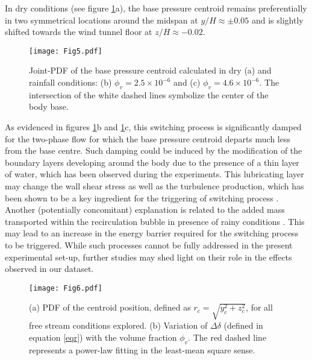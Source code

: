 \documentclass[doublecol]{epl2}
\begin{document}

In dry conditions (see figure \ref{fig5}a), the base pressure centroid remains preferentially in two symmetrical locations around the midspan at $y/H \approx \pm 0.05$ and is slightly shifted towards the wind tunnel floor at $z/H \approx -0.02$.

\begin{figure}
\centering
\texttt{[image: Fig5.pdf]}
\caption{Joint-PDF of the base pressure centroid calculated in dry (a) and rainfall conditions: (b) $\phi_v = 2.5\times10^{-6}$ and (c) $\phi_v = 4.6\times10^{-6}$. The intersection of the white dashed lines symbolize the center of the body base.}
\label{fig5}
\end{figure}


As evidenced in figures \ref{fig5}b and \ref{fig5}c, this switching process is significantly damped for the two-phase flow for which the base pressure centroid departs much less from the base centre. Such damping could be induced by the modification of the boundary layers developing around the body due to the presence of a thin layer of water, which has been observed during the experiments. This lubricating layer may change the wall shear stress as well as the turbulence production, which has been shown to be a key ingredient for the triggering of switching process \cite{hesse2021}. Another (potentially concomitant) explanation is related to the added mass transported within the recirculation bubble in presence of rainy conditions \cite{travis2022,lorite2020}. This may lead to an increase in the energy barrier required for the switching process to be triggered. While such processes cannot be fully addressed in the present experimental set-up, further studies may shed light on their role in the effects observed in our dataset.

\begin{figure}
\centering
\texttt{[image: Fig6.pdf]}
\caption{(a) PDF of the centroid position, defined as $r_c=\sqrt{y_c^2+z_c^2}$, for all free stream conditions explored. (b) Variation of $\Delta \delta$ (defined in equation \ref{eqr}) with the volume fraction $\phi_v$. The red dashed line represents a power-law fitting in the least-mean square sense.}
\label{fig6}
\end{figure}
\end{document}
